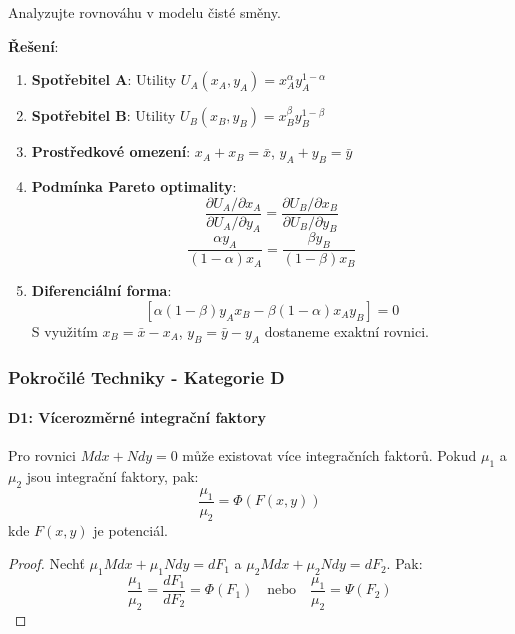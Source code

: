 \begin{example}
Analyzujte rovnováhu v modelu čisté směny.
\vspace{0.3\baselineskip}

\textbf{Řešení}:
\begin{enumerate}
\item \textbf{Spotřebitel A}: Utility $U_A(x_A, y_A) = x_A^\alpha y_A^{1-\alpha}$
\item \textbf{Spotřebitel B}: Utility $U_B(x_B, y_B) = x_B^\beta y_B^{1-\beta}$
\item \textbf{Prostředkové omezení}: $x_A + x_B = \bar{x}$, $y_A + y_B = \bar{y}$
\item \textbf{Podmínka Pareto optimality}:
\[
\frac{\partial U_A/\partial x_A}{\partial U_A/\partial y_A} = \frac{\partial U_B/\partial x_B}{\partial U_B/\partial y_B}
\]
\[
\frac{\alpha y_A}{(1-\alpha)x_A} = \frac{\beta y_B}{(1-\beta)x_B}
\]

\item \textbf{Diferenciální forma}:
\[
[\alpha(1-\beta)y_A x_B - \beta(1-\alpha)x_A y_B] = 0
\]
S využitím $x_B = \bar{x} - x_A$, $y_B = \bar{y} - y_A$ dostaneme exaktní rovnici.
\end{enumerate}
\end{example}

\vspace{0.8\baselineskip}

\subsubsection{Pokročilé Techniky - Kategorie D}
\label{subsubsec:pokrocile-techniky}

\paragraph*{D1: Vícerozměrné integrační faktory}

\begin{method}
Pro rovnici $M dx + N dy = 0$ může existovat více integračních faktorů. Pokud $\mu_1$ a $\mu_2$ jsou integrační faktory, pak:
\[
\frac{\mu_1}{\mu_2} = \Phi(F(x, y))
\]
kde $F(x, y)$ je potenciál.
\end{method}

\vspace{0.4\baselineskip}

\begin{proof}
Nechť $\mu_1 M dx + \mu_1 N dy = dF_1$ a $\mu_2 M dx + \mu_2 N dy = dF_2$. Pak:
\[
\frac{\mu_1}{\mu_2} = \frac{dF_1}{dF_2} = \Phi(F_1) \quad \text{nebo} \quad \frac{\mu_1}{\mu_2} = \Psi(F_2)
\]
\end{proof}

